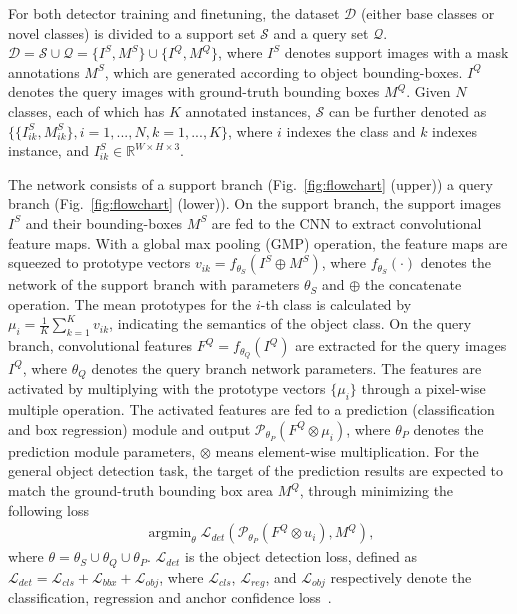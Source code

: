 \documentclass[final]{cvpr}
\begin{document}
For both detector training and finetuning, the dataset $\mathcal{D}$ (either base classes or novel classes) is divided to a support set $\mathcal{S}$ and a query set $\mathcal{Q}$. $\mathcal{D} = \mathcal{S}\cup\mathcal{Q} = \{I^S, M^S\}\cup \{I^Q, M^Q\}$, where $I^S$ denotes support images with a mask annotations $M^S$, which are generated according to object bounding-boxes. $I^Q$ denotes the query images with ground-truth bounding boxes $M^Q$. Given $N$ classes, each of which has $K$ annotated instances,  $\mathcal{S}$ can be further denoted as $\{\{I_{ik}^S,M_{ik}^S\},i=1,...,N, k=1,...,K\}$, where $i$ indexes the class and $k$ indexes instance, and $I_{ik}^S\in \mathbb{R}^{W\times H \times 3}$.

The network consists of a support branch (Fig.~\ref{fig:flowchart} (upper)) a query branch (Fig.~\ref{fig:flowchart} (lower)). On the support branch, the support images $I^S$ and their bounding-boxes $M^S$ are fed to the CNN to extract convolutional feature maps. With a global max pooling (GMP) operation, the feature maps are squeezed to prototype vectors $v_{ik} = f_{\theta_S}(I^S\oplus M^S)$, where $f_{\theta_S}(\cdot)$ denotes the network of the support branch with parameters $\theta_S$ and $\oplus$ the concatenate operation. The mean prototypes for the $i$-th class is calculated by $\mu_i =\frac{1}{K} \sum_{k=1}^{K} v_{ik}$, indicating the semantics of the object class. 
On the query branch, convolutional features $F^Q= f_{\theta_Q}(I^Q)$ are extracted for the query images $I^Q$, where $\theta_Q$ denotes the query branch network parameters. The features are activated by multiplying with the prototype vectors $\{\mu_{i}\}$ through a pixel-wise multiple operation. 
The activated features are fed to a prediction (classification and box regression) module and output $\mathcal{P}_{\theta_P}(F^Q\otimes \mu_i)$, where $\theta_P$ denotes the prediction module parameters, $\otimes$ means element-wise multiplication. For the general object detection task, the target of the prediction results are expected to match the ground-truth bounding box area $M^Q$, through minimizing the following loss
\begin{align}
   \mathop{\arg\min}_{\theta} \mathcal{L}_{det}(\mathcal{P}_{\theta_P}(F^Q\otimes u_i),M^Q) \label{eq:det_loss},
\end{align}
where $\theta=\theta_S \cup \theta_Q \cup \theta_P$. $\mathcal{L}_{det}$ is the object detection loss, defined as $\mathcal{L}_{det} = \mathcal{L}_{cls}+\mathcal{L}_{bbx}+\mathcal{L}_{obj}$, where $\mathcal{L}_{cls}$, $\mathcal{L}_{reg}$, and $\mathcal{L}_{obj}$ respectively denote the classification, regression and anchor confidence loss~\cite{FeatureReweighting,YOLOV2}.
\end{document}
